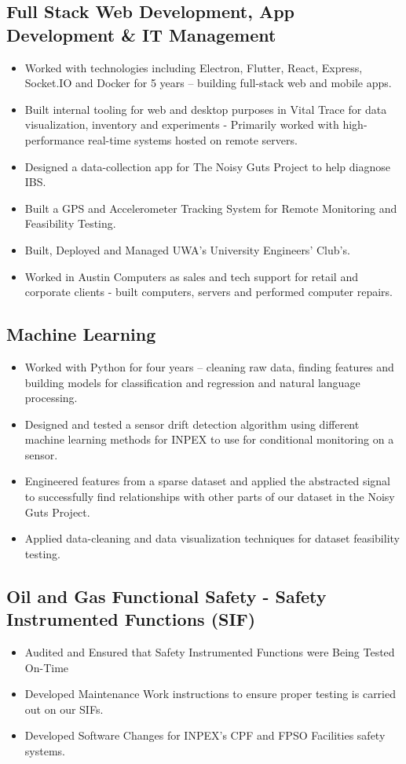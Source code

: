 \documentclass{article}[a4page]
\begin{document}
\subsection*{Full Stack Web Development, App Development \& IT Management \hfill}
\begin{itemize}
\item Worked with technologies including Electron, Flutter, React, Express, Socket.IO and Docker for 5 years – building full-stack web and mobile apps.
\item Built internal tooling for web and desktop purposes in Vital Trace for data visualization, inventory and experiments - Primarily worked with high-performance real-time systems hosted on remote servers. 
\item Designed a data-collection app for The Noisy Guts Project to help diagnose IBS.
\item Built a GPS and Accelerometer Tracking System for Remote Monitoring and Feasibility Testing.
\item Built, Deployed and Managed UWA’s University Engineers’ Club’s.
\item Worked in Austin Computers as sales and tech support for retail and corporate clients - built computers, servers and performed computer repairs.
\end{itemize}

\subsection*{Machine Learning}
\begin{itemize}
\item Worked with Python for four years – cleaning raw data, finding features and building models for classification and regression and natural language processing.
\item Designed and tested a sensor drift detection algorithm using different machine learning methods for INPEX to use for conditional monitoring on a sensor.
\item Engineered features from a sparse dataset and applied the abstracted signal to successfully find relationships with other parts of our dataset in the Noisy Guts Project.
\item Applied data-cleaning and data visualization techniques for dataset feasibility testing.
\end{itemize}

\subsection*{Oil and Gas Functional Safety - Safety Instrumented Functions (SIF)}
\begin{itemize}
\item Audited and Ensured that Safety Instrumented Functions were Being Tested On-Time
\item Developed Maintenance Work instructions to ensure proper testing is carried out on our SIFs.
\item Developed Software Changes for INPEX's CPF and FPSO Facilities safety systems.
\end{itemize}
\end{document}
